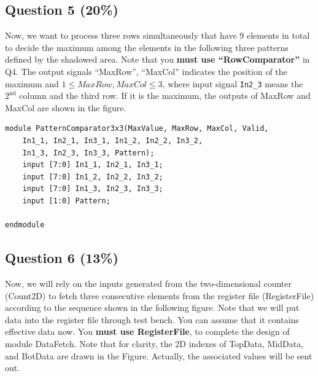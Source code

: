 \documentclass[11pt,a4paper]{article}
\newcommand{\question}[2]{\subsection*{Question #1 \hfill (#2\%)}}
\newcommand{\signal}[1]{\texttt{#1}}
\begin{document}
\question{5}{20}
Now, we want to process three rows simultaneously that have 9 elements in
total to decide the maximum among the elements in the following three
patterns defined by the shadowed area. Note that you \textbf{must use
``RowComparator''} in Q4. The output signals ``MaxRow'', ``MaxCol''
indicates the position of the maximum and
$1\leq MaxRow,MaxCol\leq3$, where input signal \signal{In2\_3} means the
$2^{\mathrm{nd}}$ column and the third row. If it is the maximum, the
outputs of MaxRow and MaxCol are shown in the figure.
\begin{center}
\end{center}
\begin{verbatim}
module PatternComparator3x3(MaxValue, MaxRow, MaxCol, Valid,
    In1_1, In2_1, In3_1, In1_2, In2_2, In3_2,
    In1_3, In2_3, In3_3, Pattern);
    input [7:0] In1_1, In2_1, In3_1;
    input [7:0] In1_2, In2_2, In3_2;
    input [7:0] In1_3, In2_3, In3_3;
    input [1:0] Pattern;

endmodule
\end{verbatim}

\question{6}{13}
Now, we will rely on the inputs generated from the two-dimensional
counter (Count2D) to fetch three consecutive elements from the register
file (RegisterFile) according to the sequence shown in the following
figure. Note that we will put data into the register file through test
bench. You can assume that it contains effective data now. You
\textbf{must use RegisterFile}, to complete the design of module DataFetch.
Note that for clarity, the 2D indexes of TopData, MidData, and BotData are
drawn in the Figure. Actually, the associated values will be sent out.
\end{document}
